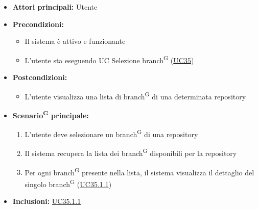 \documentclass[a4paper, 11pt]{article}
\begin{document}
\begin{itemize}
    \item \textbf{Attori principali:} Utente 
    \item \textbf{Precondizioni:}
    \begin{itemize}
        \item Il sistema è attivo e funzionante
        \item L'utente sta eseguendo UC Selezione branch\textsuperscript{G} (\hyperref[UC35]{UC35})
    \end{itemize}
    \item \textbf{Postcondizioni:}
    \begin{itemize}
        \item L'utente visualizza una lista di branch\textsuperscript{G} di una determinata repository
    \end{itemize}
    \item \textbf{Scenario\textsuperscript{G} principale:}
    \begin{enumerate}
        \item L'utente deve selezionare un branch\textsuperscript{G} di una repository
        \item Il sistema recupera la lista dei branch\textsuperscript{G} disponibili per la repository
        \item Per ogni branch\textsuperscript{G} presente nella lista, il sistema visualizza il dettaglio del singolo branch\textsuperscript{G} (\hyperref[UC35.1.1]{UC35.1.1})
    \end{enumerate}
    \item \textbf{Inclusioni:} \hyperref[UC35.1.1]{UC35.1.1}
\end{itemize}
\end{document}
